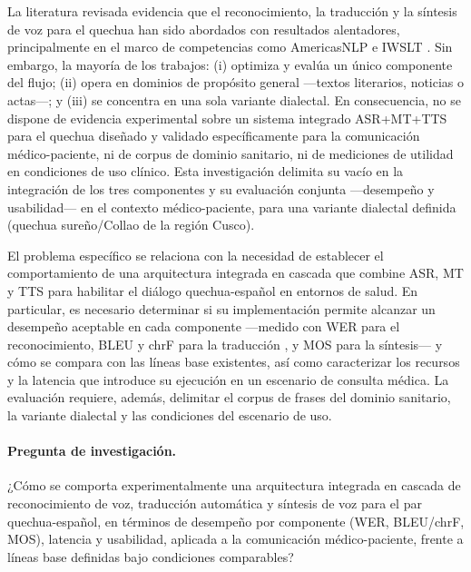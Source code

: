 La literatura revisada evidencia que el reconocimiento, la traducción y la
síntesis de voz para el quechua han sido abordados con resultados alentadores,
principalmente en el marco de competencias como AmericasNLP e IWSLT
\parencite{Oncevay2021194,Ebrahimi2024236}. Sin embargo, la mayoría de los
trabajos: (i) optimiza y evalúa un único componente del flujo; (ii) opera en
dominios de propósito general —textos literarios, noticias o actas—; y (iii) se
concentra en una sola variante dialectal. En consecuencia, no se dispone de
evidencia experimental sobre un sistema integrado ASR+MT+TTS para el quechua
diseñado y validado específicamente para la comunicación médico-paciente, ni de
corpus de dominio sanitario, ni de mediciones de utilidad en condiciones de uso
clínico. Esta investigación delimita su vacío en la integración de los tres
componentes y su evaluación conjunta —desempeño y usabilidad— en el contexto
médico-paciente, para una variante dialectal definida (quechua sureño/Collao de
la región Cusco).

El problema específico se relaciona con la necesidad de establecer el
comportamiento de una arquitectura integrada en cascada que combine ASR, MT y
TTS para habilitar el diálogo quechua-español en entornos de salud. En
particular, es necesario determinar si su implementación permite alcanzar un
desempeño aceptable en cada componente —medido con WER para el reconocimiento,
BLEU y chrF para la traducción \parencite{papineni2002bleu,popovic2015chrf}, y
MOS para la síntesis— y cómo se compara con las líneas base existentes, así como
caracterizar los recursos y la latencia que introduce su ejecución en un
escenario de consulta médica. La evaluación requiere, además, delimitar el
corpus de frases del dominio sanitario, la variante dialectal y las condiciones
del escenario de uso.

\paragraph{Pregunta de investigación.}
¿Cómo se comporta experimentalmente una arquitectura integrada en cascada de
reconocimiento de voz, traducción automática y síntesis de voz para el par
quechua-español, en términos de desempeño por componente (WER, BLEU/chrF, MOS),
latencia y usabilidad, aplicada a la comunicación médico-paciente, frente a
líneas base definidas bajo condiciones comparables?

